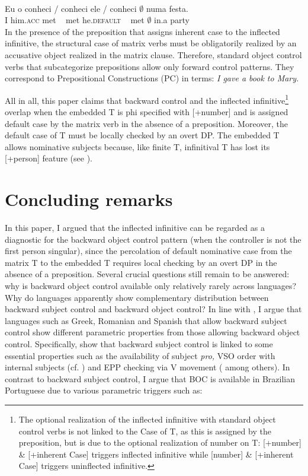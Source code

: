 \documentclass[output=paper]{langsci/langscibook}
\begin{document}
\ea%
    \citep[328]{Farrell1990}\label{ex:moreno:29}\\
    \gll Eu  o       conheci \slash{} conheci ele        \slash{}  conheci {$\emptyset$} numa festa. \\
         I  him.\textsc{acc} met  ~  met  he.\textsc{default} ~ met   {$\emptyset$} in.a    party\\
\z
In the presence of the preposition that assigns inherent case to the inflected infinitive, the structural case of matrix verbs must be obligatorily realized by an accusative object realized in the matrix clause. Therefore, standard object control verbs that subcategorize prepositions allow only forward control patterns. They correspond to Prepositional Constructions (PC) in  terms: \textit{I gave a book to Mary.}

All in all, this paper claims that backward control and the inflected infinitive\footnote{The optional realization of the inflected infinitive with standard object control verbs is not linked to the Case of T, as this is assigned by the preposition, but is due to the optional realization of number on T: [+number] \& [+inherent Case]  triggers inflected infinitive while [\textminus number] \& [+inherent Case] triggers uninflected infinitive.} overlap when the embedded T is phi specified with [+number] and is assigned default case by the matrix verb in the absence of a preposition. Moreover, the default case of T must be locally checked by an overt DP. The embedded T allows nominative subjects because, like finite T, infinitival T has lost its [+person] feature (see \citealt{Cyrino2010}).

\section{Concluding remarks}%

In this paper, I argued that the inflected infinitive can be regarded as a diagnostic for the backward object control pattern (when the controller is not the first person singular), since the percolation of default nominative case from the matrix T to the embedded T requires local checking by an overt DP in the absence of a preposition. Several crucial questions still remain to be answered: why is backward object control available only relatively rarely across languages? Why do languages apparently show complementary distribution between backward subject control and backward object control? In line with \citet{Alexiadou2010}, I argue that languages such as Greek, Romanian and Spanish that allow backward subject control show different parametric properties from those allowing backward object control. Specifically, \citet{Alexiadou2010} show that backward subject control is linked to some essential properties such as the availability of subject \textit{pro,} VSO order with internal subjects (cf. \citealt{Alexiadou2001Functional}) and EPP checking via V movement (\citealt{Alexiadou1998} among others). In contrast to backward subject control, I argue that BOC is available in Brazilian Portuguese due to various parametric triggers such as:
\end{document}
